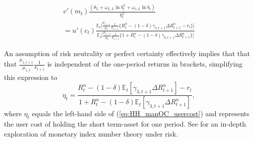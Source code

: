 \documentclass[11pt,a4paper,margin=1.5in]{article}
\begin{document}
\begin{multline}
	v'(m_t)\frac{\left(\theta_L + \omega_{L,L}\ln b^L_t + \omega_{s,L}\ln b_t\right)}{b^L_t} \\= u'(c_t)\frac{\mathbb{E}_t \Big[ \frac{\mu_{t+1}}{\mu_{t}}\frac{1}{\pi_{t+1}} \Big\{ R^n_t - (1-\delta)\gamma_{3,t+1}\Delta R^n_{t+1} - r_t \Big\}\Big]}{\mathbb{E}_t \Big[ \frac{\mu_{t+1}}{\mu_{t}}\frac{1}{\pi_{t+1}} \Big\{ 1+ R^n_t - (1-\delta)\gamma_{3,t+1}\Delta R^n_{t+1}\Big\}\Big]}
\end{multline}

An assumption of risk neutrality or perfect certainty effectively implies that that that $\frac{\mu_{1,t+1}}{\mu_{1,t}} \frac{1}{\pi_{t+1}}$ is independent of the one-period returns in brackets, simplifying this expression to 
\begin{equation}
	\eta_t = \frac{R^n_t  - (1-\delta)\mathbb{E}_t[\gamma_{3,t+1}\Delta R^n_{t+1}] - r_t }{ 1+ R^n_t - (1-\delta)\mathbb{E}_t[\gamma_{3,t+1}\Delta R^n_{t+1}]},
	\label{eq:usercost_ST}
\end{equation}
where $\eta_t$ equals the left-hand side of (\ref{eq:HH_manOC_usercost}) and represents the user cost of holding the short term-asset for one period.
See \citet*{Barnett-Liu-Jensen:1997} for an in-depth exploration of monetary index number theory under risk.
\end{document}
